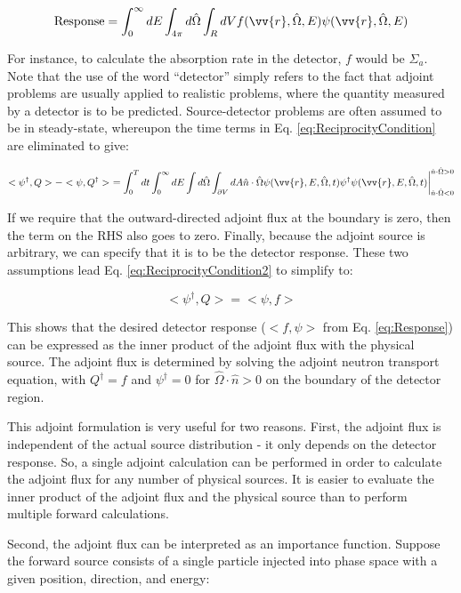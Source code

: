 \documentclass[10pt]{article}
\newcommand{\hO}{\hat{\Omega}}
\newcommand{\spa}{(\vv{r}, E, \hO, t)}
\begin{document}
\begin{flushleft}
\begin{equation}
\label{eq:Response}
\textrm{Response}=\int_0^\infty dE\int_{4\pi}d\hO  \int_RdVf(\vv{r},\hO  ,E)\psi(\vv{r},\hO  ,E)
\end{equation}

For instance, to calculate the absorption rate in the detector, \(f\) would be \(\Sigma_a\). Note that the use of the word ``detector'' simply refers to the fact that adjoint problems are usually applied to realistic problems, where the quantity measured by a detector is to be predicted. Source-detector problems are often assumed to be in steady-state, whereupon the time terms in Eq. \eqref{eq:ReciprocityCondition} are eliminated to give:

\begin{equation}
\label{eq:ReciprocityCondition2}
<\psi^\dagger,Q>-<\psi,Q^\dagger> \ = \int_0^{T}dt\int_0^\infty dE\int d\hO  \int_{\partial V}dA\hat{n}\cdot\hO  \psi\spa \psi^\dagger\psi\spa \biggr\rvert_{\hat{n}\cdot\hO  <0}^{\hat{n}\cdot\hO  >0}
\end{equation}

If we require that the outward-directed adjoint flux at the boundary is zero, then the term on the RHS also goes to zero. Finally, because the adjoint source is arbitrary, we can specify that it is to be the detector response. These two assumptions lead Eq. \eqref{eq:ReciprocityCondition2} to simplify to:

\begin{equation}
\label{eq:ReciprocityCondition3}
<\psi^\dagger,Q>=<\psi,f>
\end{equation}

This shows that the desired detector response (\(<f,\psi>\) from Eq. \eqref{eq:Response}) can be expressed as the inner product of the adjoint flux with the physical source. The adjoint flux is determined by solving the adjoint neutron transport equation, with \(Q^\dagger=f\) and \(\psi^\dagger=0\) for \(\hO  \cdot\hat{n}>0\) on the boundary of the detector region. 

This adjoint formulation is very useful for two reasons. First, the adjoint flux is independent of the actual source distribution - it only depends on the detector response. So, a single adjoint calculation can be performed in order to calculate the adjoint flux for any number of physical sources. It is easier to evaluate the inner product of the adjoint flux and the physical source than to perform multiple forward calculations. 

Second, the adjoint flux can be interpreted as an importance function. Suppose the forward source consists of a single particle injected into phase space with a given position, direction, and energy:


\end{flushleft}
\end{document}
